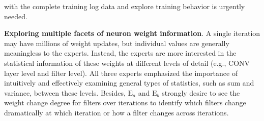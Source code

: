 \documentclass[format=acmsmall, review=false, screen=true]{acmart}
\newcommand{\ea}{{$\mathrm{E}_a$}\xspace}
\newcommand{\eb}{{$\mathrm{E}_b$}\xspace}
\newcommand{\dy}{\textcolor[rgb]{0,0,0}}
\begin{document}
with the complete training log data and explore training behavior is urgently needed. %
	
	\item \textbf{Exploring multiple facets of neuron weight information}.
	A single iteration may have millions of weight updates, but individual values are generally meaningless to the experts.
	Instead, the experts are more interested in the statistical information of these weights at different levels of detail (e.g., CONV layer level and filter level).
	All three experts emphasized the importance of intuitively and effectively examining general types of statistics, such as sum and variance, between these levels.
	Besides, \ea and \eb strongly desire to see the weight change degree for filters over iterations to identify which filters change dramatically at which iteration or how a filter changes across iterations.
\end{document}
